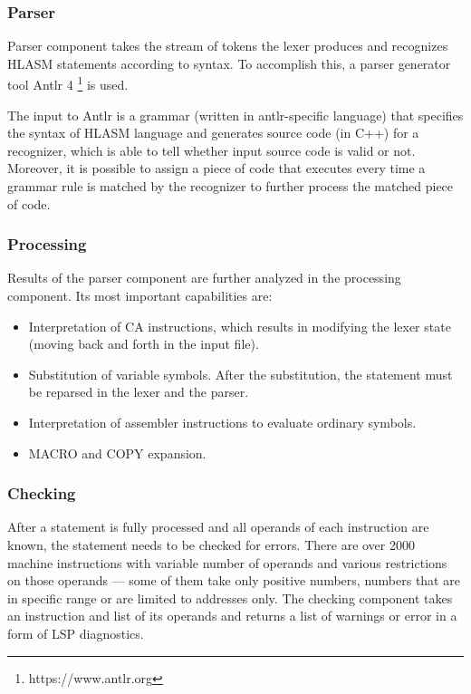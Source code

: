 \subsubsection{Parser}

Parser component takes the stream of tokens the lexer produces and recognizes HLASM statements according to syntax. To accomplish this, a parser generator tool Antlr 4 \footnote{https://www.antlr.org} is used.

The input to Antlr is a grammar (written in antlr-specific language) that specifies the syntax of HLASM language and generates source code (in C++) for a recognizer, which is able to tell whether input source code is valid or not. Moreover, it is possible to assign a piece of code that executes every time a grammar rule is matched by the recognizer to further process the matched piece of code.


\subsubsection{Processing}

Results of the parser component are further analyzed in the processing component. Its most important capabilities are:
\begin{itemize}
	\item Interpretation of CA instructions, which results in modifying the lexer state (moving back and forth in the input file).
	\item Substitution of variable symbols. After the substitution, the statement must be reparsed in the lexer and the parser.
	\item Interpretation of assembler instructions to evaluate ordinary symbols.
	\item MACRO and COPY expansion.
\end{itemize}

\subsubsection{Checking}
After a statement is fully processed and all operands of each instruction are known, the statement needs to be checked for errors. There are over 2000 machine instructions with variable number of operands and various restrictions on those operands --- some of them take only positive numbers, numbers that are in specific range or are limited to addresses only. The checking component takes an instruction and list of its operands and returns a list of warnings or error in a form of LSP diagnostics.

